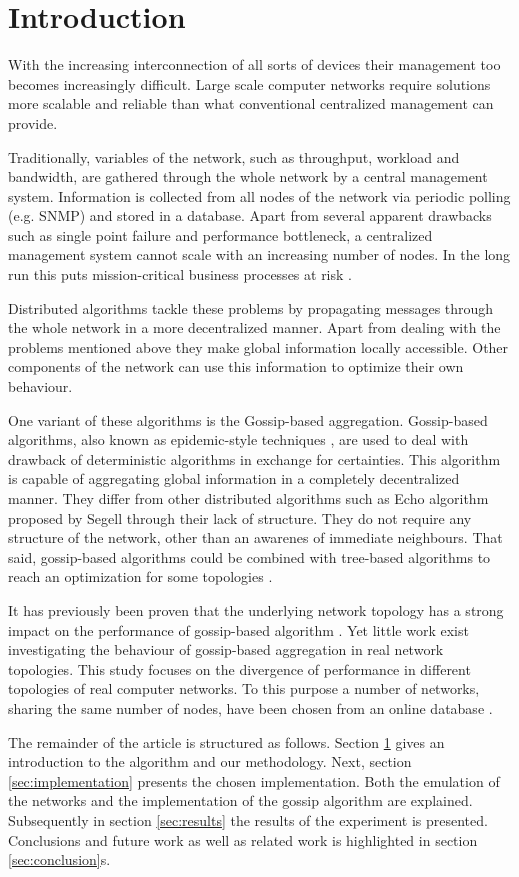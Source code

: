 \section{Introduction}
\label{sec:theory}
With the increasing interconnection of all sorts of devices their management too becomes increasingly difficult. Large scale computer networks require solutions more scalable and reliable than what conventional centralized management can provide.

Traditionally, variables of the network, such as throughput, workload and bandwidth, are gathered through the whole network by a central management system. Information is collected from all nodes of the network via periodic polling (e.g. SNMP) and stored in a database. Apart from several apparent drawbacks such as single point failure and performance bottleneck, a centralized management system cannot scale with an increasing number of nodes. In the long run this puts mission-critical business processes at risk \cite{Stadler529980}.

Distributed algorithms tackle these problems by propagating messages through the whole network in a more decentralized manner. Apart from dealing with the problems mentioned above they make global information locally accessible. Other components of the network can use this information to optimize their own behaviour\cite{jelasity_gossip-based_2005}.

One variant of these algorithms is the Gossip-based aggregation. Gossip-based algorithms, also known as epidemic-style techniques \cite{I.Gupta2006}, are used to deal with drawback of deterministic algorithms in exchange for certainties. This algorithm is capable of aggregating global information in a completely decentralized manner. They differ from other distributed algorithms such as Echo algorithm proposed by Segell \cite{SegallG89} through their lack of structure. They do not require any structure of the network, other than an awarenes of immediate neighbours. That said, gossip-based algorithms could be combined with tree-based algorithms to reach an optimization for some topologies \cite{KyasanurCG06}.

It has previously been proven that the underlying network topology has a strong impact on the performance of gossip-based algorithm \cite{5929538}\cite{jelasity_gossip-based_2005}. Yet little work exist investigating the behaviour of gossip-based aggregation in real network topologies. This study focuses on the divergence of performance in different topologies of real computer networks. To this purpose a number of networks, sharing the same number of nodes, have been chosen from an online database \cite{knight_internet_2011}.

The remainder of the article is structured as follows. Section \ref{sec:theory} gives an introduction to the algorithm and our methodology. Next, section \ref{sec:implementation} presents the chosen implementation. Both the emulation of the networks and the implementation of the gossip algorithm are explained. Subsequently in section \ref{sec:results} the results of the experiment is presented. Conclusions and future work as well as related work is highlighted in section \ref{sec:conclusion}s.
